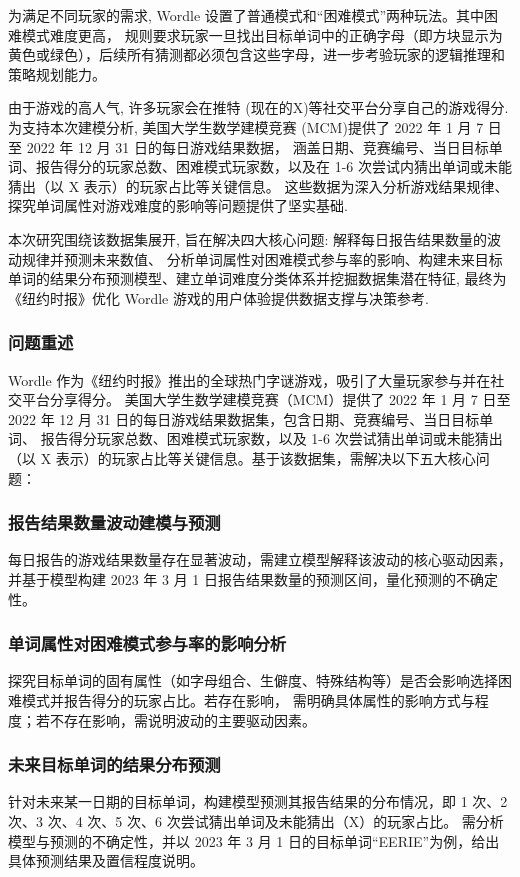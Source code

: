 \documentclass[12pt]{article}  %
\begin{document}
为满足不同玩家的需求, Wordle 设置了普通模式和“困难模式”两种玩法。其中困难模式难度更高，
规则要求玩家一旦找出目标单词中的正确字母（即方块显示为黄色或绿色），后续所有猜测都必须包含这些字母，进一步考验玩家的逻辑推理和策略规划能力。

由于游戏的高人气, 许多玩家会在推特 (现在的X)等社交平台分享自己的游戏得分. 为支持本次建模分析, 
美国大学生数学建模竞赛 (MCM)提供了 2022 年 1 月 7 日至 2022 年 12 月 31 日的每日游戏结果数据，
涵盖日期、竞赛编号、当日目标单词、报告得分的玩家总数、困难模式玩家数，以及在 1-6 次尝试内猜出单词或未能猜出（以 X 表示）的玩家占比等关键信息。
这些数据为深入分析游戏结果规律、探究单词属性对游戏难度的影响等问题提供了坚实基础.

本次研究围绕该数据集展开, 旨在解决四大核心问题: 解释每日报告结果数量的波动规律并预测未来数值、
分析单词属性对困难模式参与率的影响、构建未来目标单词的结果分布预测模型、建立单词难度分类体系并挖掘数据集潜在特征, 
最终为《纽约时报》优化 Wordle 游戏的用户体验提供数据支撑与决策参考. 


\subsubsection{问题重述}
Wordle 作为《纽约时报》推出的全球热门字谜游戏，吸引了大量玩家参与并在社交平台分享得分。
美国大学生数学建模竞赛（MCM）提供了 2022 年 1 月 7 日至 2022 年 12 月 31 日的每日游戏结果数据集，包含日期、竞赛编号、当日目标单词、
报告得分玩家总数、困难模式玩家数，以及 1-6 次尝试猜出单词或未能猜出（以 X 表示）的玩家占比等关键信息。基于该数据集，需解决以下五大核心问题：

\subsubsection{报告结果数量波动建模与预测}
每日报告的游戏结果数量存在显著波动，需建立模型解释该波动的核心驱动因素，并基于模型构建 2023 年 3 月 1 日报告结果数量的预测区间，量化预测的不确定性。

\subsubsection{单词属性对困难模式参与率的影响分析}
探究目标单词的固有属性（如字母组合、生僻度、特殊结构等）是否会影响选择困难模式并报告得分的玩家占比。若存在影响，
需明确具体属性的影响方式与程度；若不存在影响，需说明波动的主要驱动因素。

\subsubsection{未来目标单词的结果分布预测}
针对未来某一日期的目标单词，构建模型预测其报告结果的分布情况，即 1 次、2 次、3 次、4 次、5 次、6 次尝试猜出单词及未能猜出（X）的玩家占比。
需分析模型与预测的不确定性，并以 2023 年 3 月 1 日的目标单词“EERIE”为例，给出具体预测结果及置信程度说明。
\end{document}
